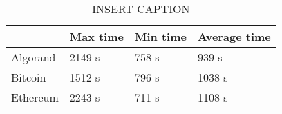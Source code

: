 \begin{center}
\begin{table}[h]
    \centering
    \begin{tabular}{|l|l|l|l|}
        \hline
                  & Max time & Min time & Average time \\ \hline
        Algorand  & 2149 s   & 758 s    & 939  s       \\ \hline
        Bitcoin   & 1512 s   & 796 s    & 1038 s       \\ \hline
        Ethereum  & 2243 s   & 711 s    & 1108 s       \\ \hline
    \end{tabular}
    \caption{INSERT CAPTION}
    \label{tab:gqm}
\end{table}
\end{center}
